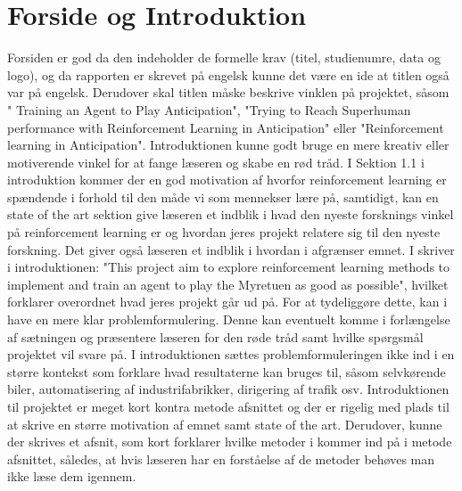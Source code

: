 \documentclass[11pt, fleqn, titlepage]{article}
\begin{document}
	\section*{Forside og Introduktion}
	Forsiden er god da den indeholder de formelle krav (titel, studienumre, data og logo), og da rapporten er skrevet på engelsk kunne det være en ide at titlen også var på engelsk. Derudover skal titlen måske beskrive vinklen på projektet, såsom " Training an Agent to Play Anticipation", "Trying to Reach Superhuman performance with Reinforcement Learning in Anticipation" eller "Reinforcement learning in Anticipation". Introduktionen kunne godt bruge en mere kreativ eller motiverende vinkel for at fange læseren og skabe en rød tråd. I Sektion 1.1 i introduktion kommer der en god motivation af hvorfor reinforcement learning er spændende i forhold til den måde vi som mennekser lære på, samtidigt, kan en state of the art sektion give læseren et indblik i hvad den nyeste forsknings vinkel på reinforcement learning er og hvordan jeres projekt relatere sig til den nyeste forskning. Det giver også læseren et indblik i hvordan i afgrænser emnet. I skriver i introduktionen: "This project aim to explore reinforcement learning methods to implement and train an agent to play the Myretuen as good as possible", hvilket forklarer overordnet hvad jeres projekt går ud på. For at tydeliggøre dette, kan i have en mere klar problemformulering. Denne kan eventuelt komme i forlængelse af sætningen og præsentere læseren for den røde tråd samt hvilke spørgsmål projektet vil svare på. I introduktionen sættes problemformuleringen ikke ind i en større kontekst som forklare hvad resultaterne kan bruges til, såsom selvkørende biler, automatisering af industrifabrikker, dirigering af trafik osv. Introduktionen til projektet er meget kort kontra metode afsnittet og der er rigelig med plads til at skrive en større motivation af emnet samt state of the art. Derudover, kunne der skrives et afsnit, som kort forklarer hvilke metoder i kommer ind på i metode afsnittet, således, at hvis læseren har en forståelse af de metoder behøves man ikke læse dem igennem. 
	
\end{document}

